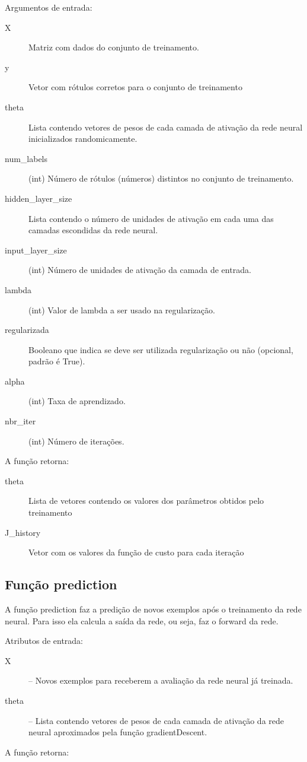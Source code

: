\documentclass[12pt]{article}
\begin{document}
Argumentos de entrada:
\begin{description} 

\item[X] Matriz com dados do conjunto de treinamento.
\item[y] Vetor com rótulos corretos para o conjunto de treinamento
\item[theta] Lista contendo vetores de pesos de cada camada de ativação da rede neural inicializados randomicamente.
\item[num\_labels] (int) Número de rótulos (números) distintos no conjunto de treinamento.
\item[hidden\_layer\_size] Lista contendo o número de unidades de ativação em cada uma das camadas escondidas da rede neural.
\item[input\_layer\_size] (int) Número de unidades de ativação da camada de entrada.
\item[lambda] (int) Valor de lambda a ser usado na regularização.
\item[regularizada] Booleano que indica se deve ser utilizada regularização ou não (opcional, padrão é True).
\item[alpha] (int) Taxa de aprendizado.
\item[nbr\_iter] (int) Número de iterações.
\end{description}
A função retorna: 
\begin{description}
\item[theta] Lista de vetores contendo os valores dos parâmetros obtidos pelo treinamento
\item[J\_history] Vetor com os valores da função de custo para cada iteração 
\end{description}

\subsection{Função prediction}

A função prediction faz a predição de novos exemplos após o treinamento da rede neural. Para isso ela calcula a saída da rede, ou seja, faz o forward da rede.

Atributos de entrada:

\begin{description}
\item[X] – Novos exemplos para receberem a avaliação da rede neural já treinada.
\item[theta] – Lista contendo vetores de pesos de cada camada de ativação da rede neural aproximados pela função gradientDescent.
\end{description}
A função retorna:
\end{document}
